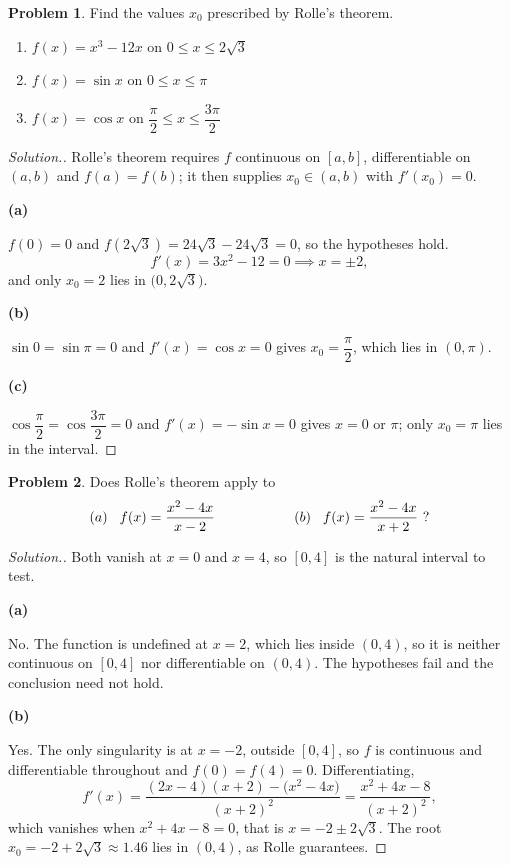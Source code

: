 \documentclass[11pt,a4paper]{article}
\theoremstyle{definition}
\newtheorem{problemx}{Problem}[subsection]
\newenvironment{problem}{\begin{problemx}}{\end{problemx}}
\newenvironment{solution}
  {\renewcommand{\qedsymbol}{}\begin{proof}[\textit{Solution}.]}
  {\end{proof}}
\newcommand{\subhead}[1]{%
  \par\medskip\noindent\textbf{#1}\par\nobreak\smallskip}
\begin{document}
\begin{problem}
Find the values $x_0$ prescribed by Rolle's theorem.
\begin{enumerate}
\item[(a)] $f(x) = x^3-12x$ on $0\leq x\leq 2\sqrt3$
\item[(b)] $f(x) = \sin x$ on $0\leq x\leq\pi$
\item[(c)] $f(x) = \cos x$ on $\dfrac{\pi}{2}\leq x\leq\dfrac{3\pi}{2}$
\end{enumerate}
\end{problem}
\begin{solution}
Rolle's theorem requires $f$ continuous on $[a,b]$, differentiable on $(a,b)$
and $f(a) = f(b)$; it then supplies $x_0\in(a,b)$ with $f'(x_0) = 0$.

\subhead{(a)}
$f(0) = 0$ and $f(2\sqrt3) = 24\sqrt3 - 24\sqrt3 = 0$, so the hypotheses hold.
$$f'(x) = 3x^2-12 = 0 \implies x = \pm 2 ,$$
and only $x_0 = 2$ lies in $\big(0, 2\sqrt3\big)$.

\subhead{(b)}
$\sin 0 = \sin\pi = 0$ and $f'(x) = \cos x = 0$ gives
$x_0 = \dfrac{\pi}{2}$, which lies in $(0,\pi)$.

\subhead{(c)}
$\cos\dfrac{\pi}{2} = \cos\dfrac{3\pi}{2} = 0$ and $f'(x) = -\sin x = 0$ gives
$x = 0$ or $\pi$; only $x_0 = \pi$ lies in the interval.
\end{solution}

\begin{problem}
Does Rolle's theorem apply to
$$(a)\hspace{0.3cm} f(x) = \frac{x^2-4x}{x-2}
\hspace{2cm}(b)\hspace{0.3cm} f(x) = \frac{x^2-4x}{x+2}\ ?$$
\end{problem}
\begin{solution}
Both vanish at $x=0$ and $x=4$, so $[0,4]$ is the natural interval to test.

\subhead{(a)}
No. The function is undefined at $x=2$, which lies inside $(0,4)$, so it is
neither continuous on $[0,4]$ nor differentiable on $(0,4)$. The hypotheses fail
and the conclusion need not hold.

\subhead{(b)}
Yes. The only singularity is at $x=-2$, outside $[0,4]$, so $f$ is continuous
and differentiable throughout and $f(0) = f(4) = 0$. Differentiating,
$$f'(x) = \frac{(2x-4)(x+2) - \big(x^2-4x\big)}{(x+2)^2}
= \frac{x^2+4x-8}{(x+2)^2},$$
which vanishes when $x^2+4x-8 = 0$, that is $x = -2\pm 2\sqrt3$. The root
$x_0 = -2+2\sqrt3 \approx 1.46$ lies in $(0,4)$, as Rolle guarantees.
\end{solution}
\end{document}
